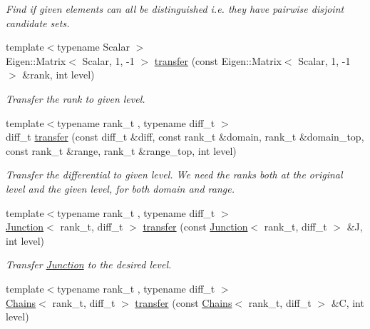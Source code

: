 \begin{DoxyCompactItemize}
\begin{DoxyCompactList}\small\item\em Find if given elements can all be distinguished i.\+e. they have pairwise disjoint candidate sets. \end{DoxyCompactList}\item 
{\footnotesize template$<$typename Scalar $>$ }\\Eigen\+::\+Matrix$<$ Scalar, 1, -\/1 $>$ \hyperlink{namespaceMackey_a671613d53fc3b0c9c4b115bc8b2797e6}{transfer} (const Eigen\+::\+Matrix$<$ Scalar, 1, -\/1 $>$ \&rank, int level)
\begin{DoxyCompactList}\small\item\em Transfer the rank to given level. \end{DoxyCompactList}\item 
{\footnotesize template$<$typename rank\+\_\+t , typename diff\+\_\+t $>$ }\\diff\+\_\+t \hyperlink{namespaceMackey_ad7524839b58c80d4b2c54827e4833b12}{transfer} (const diff\+\_\+t \&diff, const rank\+\_\+t \&domain, rank\+\_\+t \&domain\+\_\+top, const rank\+\_\+t \&range, rank\+\_\+t \&range\+\_\+top, int level)
\begin{DoxyCompactList}\small\item\em Transfer the differential to given level. We need the ranks both at the original level and the given level, for both domain and range. \end{DoxyCompactList}\item 
{\footnotesize template$<$typename rank\+\_\+t , typename diff\+\_\+t $>$ }\\\hyperlink{classMackey_1_1Junction}{Junction}$<$ rank\+\_\+t, diff\+\_\+t $>$ \hyperlink{namespaceMackey_a914aba7f868e67ae3fd9da3995678660}{transfer} (const \hyperlink{classMackey_1_1Junction}{Junction}$<$ rank\+\_\+t, diff\+\_\+t $>$ \&J, int level)
\begin{DoxyCompactList}\small\item\em Transfer \hyperlink{classMackey_1_1Junction}{Junction} to the desired level. \end{DoxyCompactList}\item 
{\footnotesize template$<$typename rank\+\_\+t , typename diff\+\_\+t $>$ }\\\hyperlink{classMackey_1_1Chains}{Chains}$<$ rank\+\_\+t, diff\+\_\+t $>$ \hyperlink{namespaceMackey_a50837580391b5c6705e23c637d742b22}{transfer} (const \hyperlink{classMackey_1_1Chains}{Chains}$<$ rank\+\_\+t, diff\+\_\+t $>$ \&C, int level)

\end{DoxyCompactItemize}
